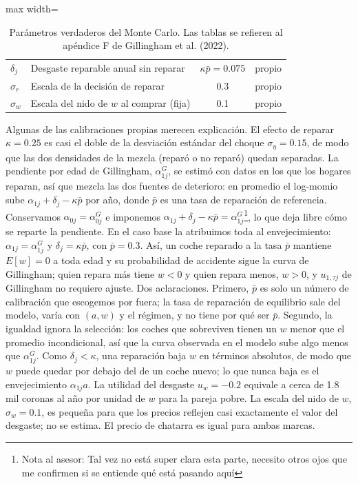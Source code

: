 \documentclass{article}
\begin{document}
\begin{table}[htbp]
\begin{adjustbox}{max width=\textwidth}
\begin{tabular}{llrrl}
$\delta_j$ & Desgaste reparable anual sin reparar & \multicolumn{2}{c}{$\kappa\bar{p}=0.075$} & propio \\
$\sigma_r$ & Escala de la decisión de reparar & \multicolumn{2}{c}{0.3} & propio \\
$\sigma_w$ & Escala del nido de $w$ al comprar (fija) & \multicolumn{2}{c}{0.1} & propio \\
\bottomrule
\end{tabular}
\end{adjustbox}
\caption{Parámetros verdaderos del Monte Carlo. Las tablas se refieren al apéndice F de Gillingham et al. (2022).}
\label{tab:parametros}
\end{table}

Algunas de las calibraciones propias merecen explicación. El efecto de reparar $\kappa=0.25$ es casi el doble de la desviación estándar del choque $\sigma_\eta=0.15$, de modo que las dos densidades de la mezcla (reparó o no reparó) quedan separadas. La pendiente por edad de Gillingham, $\alpha^G_{1j}$, se estimó con datos en los que los hogares reparan, así que mezcla las dos fuentes de deterioro: en promedio el log-momio sube $\alpha_{1j}+\delta_j-\kappa\bar{p}$ por año, donde $\bar{p}$ es una tasa de reparación de referencia. Conservamos $\alpha_{0j}=\alpha^G_{0j}$ e imponemos $\alpha_{1j}+\delta_j-\kappa\bar{p}=\alpha^G_{1j}$\footnote{Nota al asesor: Tal vez no está super clara esta parte, necesito otros ojos que me confirmen si se entiende qué está pasando aquí}, lo que deja libre cómo se reparte la pendiente. En el caso base la atribuimos toda al envejecimiento: $\alpha_{1j}=\alpha^G_{1j}$ y $\delta_j=\kappa\bar{p}$, con $\bar{p}=0.3$. Así, un coche reparado a la tasa $\bar{p}$ mantiene $E[w]=0$ a toda edad y su probabilidad de accidente sigue la curva de Gillingham; quien repara más tiene $w<0$ y quien repara menos, $w>0$, y $u_{1,\tau j}$ de Gillingham no requiere ajuste. Dos aclaraciones. Primero, $\bar{p}$ es solo un número de calibración que escogemos por fuera; la tasa de reparación de equilibrio sale del modelo, varía con $(a,w)$ y el régimen, y no tiene por qué ser $\bar{p}$. Segundo, la igualdad ignora la selección: los coches que sobreviven tienen un $w$ menor que el promedio incondicional, así que la curva observada en el modelo sube algo menos que $\alpha^G_{1j}$. Como $\delta_j<\kappa$, una reparación baja $w$ en términos absolutos, de modo que $w$ puede quedar por debajo del de un coche nuevo; lo que nunca baja es el envejecimiento $\alpha_{1j}a$. La utilidad del desgaste $u_w=-0.2$ equivale a cerca de 1.8 mil coronas al año por unidad de $w$ para la pareja pobre. La escala del nido de $w$, $\sigma_w=0.1$, es pequeña para que los precios reflejen casi exactamente el valor del desgaste; no se estima. El precio de chatarra es igual para ambas marcas.
\end{document}
